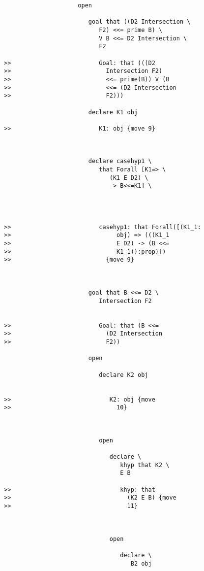 \documentclass[12pt]{article}
\begin{document}
\begin{verbatim}
                     open

                        goal that ((D2 Intersection \
                           F2) <<= prime B) \
                           V B <<= D2 Intersection \
                           F2

>>                         Goal: that (((D2
>>                           Intersection F2)
>>                           <<= prime(B)) V (B
>>                           <<= (D2 Intersection
>>                           F2)))

                        declare K1 obj

>>                         K1: obj {move 9}



                        declare casehyp1 \
                           that Forall [K1=> \
                              (K1 E D2) \
                              -> B<<=K1] \
                           



>>                         casehyp1: that Forall([(K1_1:
>>                              obj) => (((K1_1
>>                              E D2) -> (B <<=
>>                              K1_1)):prop)])
>>                           {move 9}



                        goal that B <<= D2 \
                           Intersection F2


>>                         Goal: that (B <<=
>>                           (D2 Intersection
>>                           F2))

                        open

                           declare K2 obj


>>                            K2: obj {move
>>                              10}



                           open

                              declare \
                                 khyp that K2 \
                                 E B

>>                               khyp: that
>>                                 (K2 E B) {move
>>                                 11}



                              open

                                 declare \
                                    B2 obj



\end{verbatim}
\end{document}
